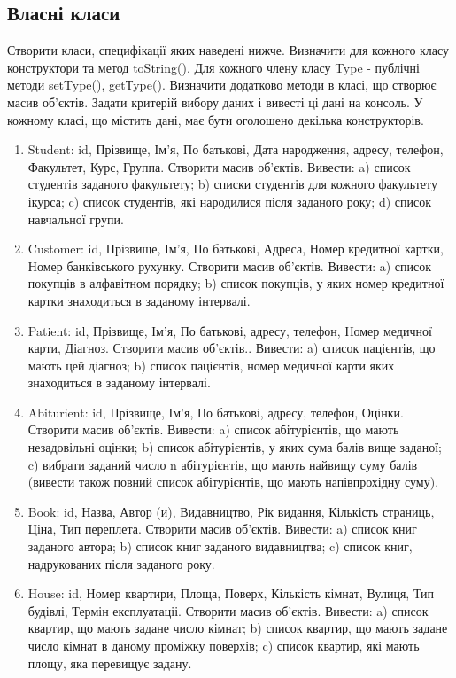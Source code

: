 \documentclass[]{article}
\begin{document}
\subsection{Власні класи}
Створити класи, специфікації яких наведені нижче.
Визначити для кожного класу конструктори та метод toString(). Для кожного члену класу Type - публічні методи setType(), getТype(). 
Визначити додатково методи в класі, що створює масив об'єктів. Задати критерій вибору даних і вивесті ці дані на консоль. 
У кожному класі, що містить дані, має бути оголошено декілька конструкторів.
\begin{enumerate}
\def\labelenumi{2.\arabic{enumi}.}
\item
Student: id, Прізвище, Ім'я, По батькові, Дата народження, адресу, телефон, Факультет, Курс, Группа.
Створити масив об'єктів. Вивести: a) список студентів заданого факультету; b) списки студентів для кожного факультету ікурса; c) список студентів, які народилися після заданого року; d) список навчальної групи.
\item Customer: id, Прізвище, Ім'я, По батькові, Адреса, Номер кредитної картки, Номер банківського рухунку.
Створити масив об'єктів. Вивести: a) список покупців в алфавітном порядку; b) список покупців, у яких номер кредитної картки знаходиться в заданому інтервалі.
\item Patient: id, Прізвище, Ім'я, По батькові, адресу, телефон, Номер медичної карти, Діагноз.
Створити масив об'єктів.. Вивести: a) список пацієнтів, що мають цей діагноз; b) список пацієнтів, номер медичної карти яких знаходиться в 
заданому інтервалі.
\item Abiturient: id, Прізвище, Ім'я, По батькові, адресу, телефон, Оцінки. 
Створити масив об'єктів. Вивести: a) список абітурієнтів, що мають незадовільні оцінки; 
b) список абітурієнтів, у яких сума балів вище заданої; c) вибрати заданий число n абітурієнтів, що мають найвищу суму балів (вивести також повний список абітурієнтів, що мають напівпрохідну суму).
\item Book: id, Назва, Автор (и), Видавництво, Рік видання, Кількість страниць, Ціна, Тип переплета.
Створити масив об'єктів. Вивести: a) список книг заданого автора; b) список книг заданого видавництва; 
c) список книг, надрукованих після заданого року.
\item House: id, Номер квартири, Площа, Поверх, Кількість кімнат, Вулиця, Тип будівлі, Термін експлуатаціі.
Створити масив об'єктів. 
Вивести: a) список квартир, що мають задане число кімнат; b) список квартир, що мають задане число кімнат в даному проміжку поверхів; c) список квартир, які мають площу, яка перевищує задану.

\end{enumerate}
\end{document}
